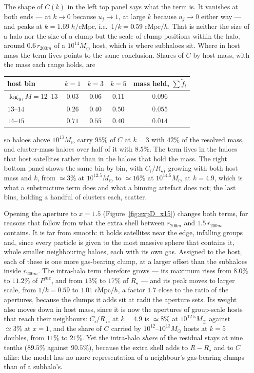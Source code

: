 \documentclass{article}
\begin{document}
The shape of $C(k)$ in the left top panel says what the term is. It vanishes
at both ends --- at $k\to0$ because $u_j\to1$, at large $k$ because $u_j\to0$
either way --- and peaks at $k = 1.69\;h/\mathrm{cMpc}$, i.e.\ $1/k =
0.59\;\mathrm{cMpc}/h$. That is neither the size of a halo nor the size of a
clump but the scale of clump positions within the halo, around
$0.6\,r_{200m}$ of a $10^{14}M_\odot$ host, which is where subhaloes sit. Where in host mass the term
lives points to the same conclusion. Shares of $C$ by host mass, with the mass each range
holds, are
\begin{center}
\renewcommand{\arraystretch}{1.2}
\begin{tabular}{lcccc}
\hline
host bin & $k=1$ & $k=3$ & $k=5$ & mass held, $\sum\tilde f_i$ \\
\hline
$\log_{10}M = 12$--$13$ & $0.03$ & $0.06$  & $0.11$ & $0.096$ \\
$13$--$14$              & $0.26$ & $0.40$  & $0.50$ & $0.055$ \\
$14$--$15$              & $0.71$ & $0.55$  & $0.40$ & $0.014$ \\
\hline
\end{tabular}
\end{center}
so haloes above $10^{13}M_\odot$ carry $95\%$ of $C$ at $k=3$ with $42\%$ of
the resolved mass, and cluster-mass haloes over half of it with $8.5\%$. The
term lives in the haloes that host satellites rather than in the haloes that
hold the mass. The right bottom panel shows the same bin by bin, with
$C_i/R_{\star\,i}$ growing with both host mass and $k$, from $\simeq3\%$ at
$10^{12.5}M_\odot$ to $\simeq16\%$ at $10^{14.5}M_\odot$ at $k = 4.9$, which is
what a substructure term does and what a binning artefact does not; the last
bins, holding a handful of clusters each, scatter.

Opening the aperture to $x = 1.5$ (Figure~\ref{fig:expD_x15}) changes both
terms, for reasons that follow from what the extra shell between $r_{200m}$
and $1.5\,r_{200m}$ contains. It is far from smooth: it holds satellites near
the edge, infalling groups and, since every particle is given to the most
massive sphere that contains it, whole smaller neighbouring haloes, each with
its own gas. Assigned to the host, each of these is one more gas-bearing clump,
at a larger offset than the subhaloes inside $r_{200m}$. The intra-halo term therefore grows --- its
maximum rises from $8.0\%$ to $11.2\%$ of $P^{me}$, and from $13\%$ to $17\%$ of
$R_\star$ --- and its peak moves to larger scale, from $1/k = 0.59$ to
$1.01\;\mathrm{cMpc}/h$, a factor $1.7$ close to the ratio of the apertures,
because the clumps it adds sit at radii the aperture sets. Its weight also
moves down in host mass, since it is now the apertures of group-scale hosts
that reach their neighbours: $C_i/R_{\star\,i}$ at $k = 4.9$ is $\simeq8\%$ at
$10^{12.5}M_\odot$ against $\simeq3\%$ at $x = 1$, and the share of $C$ carried
by $10^{12}$--$10^{13}M_\odot$ hosts at $k = 5$ doubles, from $11\%$ to $21\%$.
Yet the intra-halo \emph{share} of the residual stays at nine tenths ($89.5\%$
against $90.5\%$), because the extra shell adds to $R - R_\star$ and to $C$
alike: the model has no more representation of a neighbour's gas-bearing
clumps than of a subhalo's.
\end{document}
